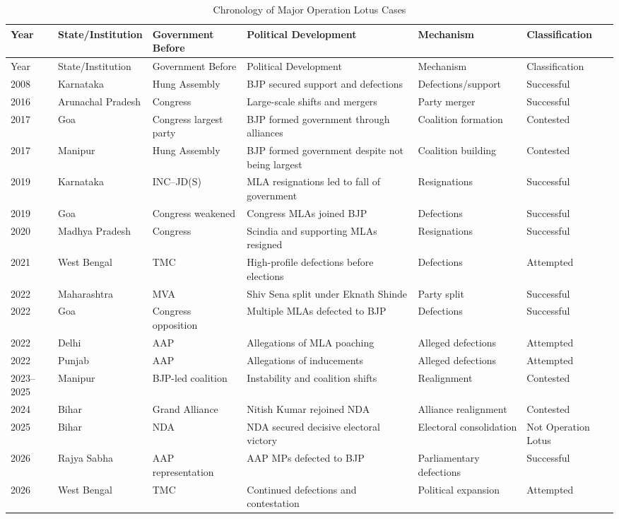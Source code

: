 \documentclass[11pt]{article}
\begin{document}
\begin{longtable}{@{}p{}p{}p{}p{}p{}p{}@{}}
\caption{Chronology of Major Operation Lotus Cases}\\
\toprule
Year & State/Institution & Government Before & Political Development & Mechanism & Classification\\
\midrule
\endfirsthead
\toprule
Year & State/Institution & Government Before & Political Development & Mechanism & Classification\\
\midrule
\endhead
2008 & Karnataka & Hung Assembly & BJP secured support and defections & Defections/support & Successful\\
2016 & Arunachal Pradesh & Congress & Large-scale shifts and mergers & Party merger & Successful\\
2017 & Goa & Congress largest party & BJP formed government through alliances & Coalition formation & Contested\\
2017 & Manipur & Hung Assembly & BJP formed government despite not being largest & Coalition building & Contested\\
2019 & Karnataka & INC--JD(S) & MLA resignations led to fall of government & Resignations & Successful\\
2019 & Goa & Congress weakened & Congress MLAs joined BJP & Defections & Successful\\
2020 & Madhya Pradesh & Congress & Scindia and supporting MLAs resigned & Resignations & Successful\\
2021 & West Bengal & TMC & High-profile defections before elections & Defections & Attempted\\
2022 & Maharashtra & MVA & Shiv Sena split under Eknath Shinde & Party split & Successful\\
2022 & Goa & Congress opposition & Multiple MLAs defected to BJP & Defections & Successful\\
2022 & Delhi & AAP & Allegations of MLA poaching & Alleged defections & Attempted\\
2022 & Punjab & AAP & Allegations of inducements & Alleged defections & Attempted\\
2023--2025 & Manipur & BJP-led coalition & Instability and coalition shifts & Realignment & Contested\\
2024 & Bihar & Grand Alliance & Nitish Kumar rejoined NDA & Alliance realignment & Contested\\
2025 & Bihar & NDA & NDA secured decisive electoral victory & Electoral consolidation & Not Operation Lotus\\
2026 & Rajya Sabha & AAP representation & AAP MPs defected to BJP & Parliamentary defections & Successful\\
2026 & West Bengal & TMC & Continued defections and contestation & Political expansion & Attempted\\
\bottomrule
\end{longtable}
\end{document}
